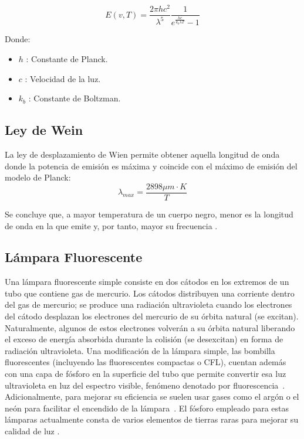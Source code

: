 \documentclass[twocolumn]{article}
\begin{document}
\begin{equation}
    E(v,T)= \frac{2\pi h c^2}{\lambda^5}\frac{1}{e^{\frac{hc}{k_b \lambda T}}-1}
    \label{eq: Ley de planck}
\end{equation}

Donde:
\begin{itemize}
    \item $h$ : Constante de Planck.
    \item $c$ : Velocidad de la luz.
    \item $k_b$ : Constante de Boltzman.
\end{itemize}
\subsection{Ley de Wein}
La ley de desplazamiento de Wien permite obtener aquella longitud de onda donde la potencia de emisión es máxima y coincide con el máximo de emisión del modelo de Planck:
\begin{equation}
    \lambda_{max} = \frac{2898\mu m \cdot K}{T}
    \label{eq: ley de Wein}
\end{equation}


Se concluye que, a mayor temperatura de un cuerpo negro, menor es la longitud de onda en la que emite y, por tanto, mayor su frecuencia \cite{Acevedo2021}.

\subsection{Lámpara Fluorescente}
Una lámpara fluorescente simple consiste en dos cátodos en los extremos de un tubo que contiene gas de mercurio. Los cátodos distribuyen una corriente dentro del gas de mercurio; se produce una radiación ultravioleta cuando los electrones del cátodo desplazan los electrones del mercurio de su órbita natural (se excitan). Naturalmente, algunos de estos electrones volverán a su órbita natural liberando el exceso de energía absorbida durante la colisión (se desexcitan) en forma de radiación ultravioleta. Una modificación de la lámpara simple, las bombilla fluorescentes (incluyendo las fluorescentes compactas o CFL), cuentan además con una capa de fósforo en la superficie del tubo que permite convertir esa luz ultravioleta en luz del espectro visible, fenómeno denotado por fluorescencia~\cite{singh2013comparative}. Adicionalmente, para mejorar su eficiencia se suelen usar gases como el argón o el neón para facilitar el encendido de la lámpara~\cite{moon1936scientific}. El fósforo empleado para estas lámparas actualmente consta de varios elementos de tierras raras para mejorar su calidad de luz \cite{Lamptech2011}.
\end{document}

